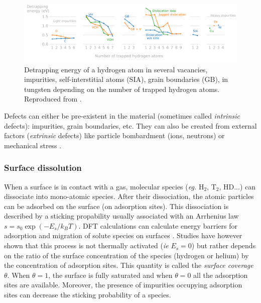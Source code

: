 \begin{figure}
    \centering
    \includegraphics[width=\linewidth]{Figures/Chapter1/trapping_energy_hydrogen_in_tungsten.pdf}
    \caption{Detrapping energy of a hydrogen atom in several vacancies, impurities, self-interstitial atoms (SIA), grain boundaries (GB), in tungsten depending on the number of trapped hydrogen atoms. Reproduced from \cite{hodille_study_2016}.}
    \label{fig: trapping energy hydrogen in tungsten}
\end{figure}

Defects can either be pre-existent in the material (sometimes called \textit{intrinsic} defects): impurities, grain boundaries, etc.
They can also be created from external factors (\textit{extrinsic} defects) like particle bombardment (ions, neutrons)  or mechanical stress .

\subsubsection{Surface dissolution}

When a surface is in contact with a gas, molecular species (\textit{eg.} $\text{H}_2$, $\text{T}_2$, $\text{HD}$...) can dissociate into mono-atomic species.
After their dissociation, the atomic particles can be adsorbed on the surface (on adsorption sites).
This dissociation is described by a sticking propability usually associated with an Arrhenius law $s = s_0 \exp{(-E_s/k_B T)}$.
DFT calculations can calculate energy barriers for adsorption and migration of solute species on surfaces .
Studies have however shown that this process is not thermally activated (\textit{ie} $E_s=0$)  but rather depends on the ratio of the surface concentration of the species (hydrogen or helium) by the concentration of adsorption sites.
This quantity is called the \textit{surface coverage} $\theta$. 
When $\theta = 1$, the surface is fully saturated and when $\theta = 0$ all the adsorption sites are available.
Moreover, the presence of impurities occupying adsorption sites can decrease the sticking probability of a species.

